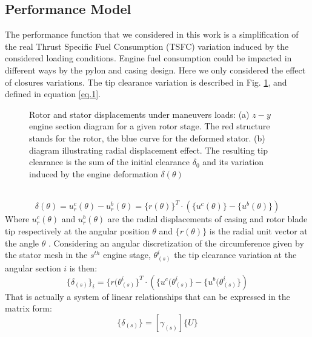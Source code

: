 \subsection{Performance Model}
\label{ssec1.2.2}
The performance function that we considered in this work is a simplification of the real Thrust Specific Fuel Consumption (TSFC) variation induced by the considered loading conditions. Engine fuel consumption could be impacted in different ways by the pylon and casing design. Here we only considered the effect of closures variations.
The tip clearance variation is described in Fig. \ref{f.2}, and defined in equation \ref{eq.1}.
  \\
  \begin{figure}[hbt!]
  \centering
       \caption{Rotor and stator displacements under maneuvers loads: (a) $z-y$ engine section diagram for a given rotor stage. The red structure stands for the rotor, the blue curve for the deformed stator. (b) diagram illustrating radial displacement effect.
       The resulting tip clearance is the sum of the initial clearance $\delta_0$ and its variation induced by the engine deformation $\delta(\theta)$ }
       \label{f.2}
     \end{figure}
  \\
\begin{equation}
\label{eq.1}
\delta(\theta)=u_r^c(\theta)-u_r^b(\theta)=\lbrace r( \theta ) \rbrace^T \cdot \left( \lbrace u^c(\theta) \rbrace-\lbrace u^b(\theta) \rbrace\right)
\end{equation}
Where $u_r^c(\theta)$ and $u_r^b(\theta)$  are the radial displacements of casing and rotor blade tip respectively at the angular position $\theta$ and $\lbrace r( \theta ) \rbrace$ is the radial unit vector at the angle $\theta$ .
Considering an angular discretization of the circumference given by the stator mesh in the $s^{th}$ engine stage, $\theta^i_{(s)}$ the tip clearance variation at the angular section $i$ is then:	
\begin{equation}
\lbrace\delta_{(s)}\rbrace_i=\lbrace r( \theta^i_{(s) } \rbrace^T \cdot \left( \lbrace u^c(\theta^i_{(s)} \rbrace-\lbrace u^b(\theta^i_{(s)} \rbrace\right)
\end{equation}
That is actually a system of linear relationships that can be expressed in the matrix form:
\begin{equation}
\label{e.3}
\lbrace\delta_{(s)}\rbrace =\left[ \gamma_{(s)} \right] \lbrace U \rbrace
\end{equation}
